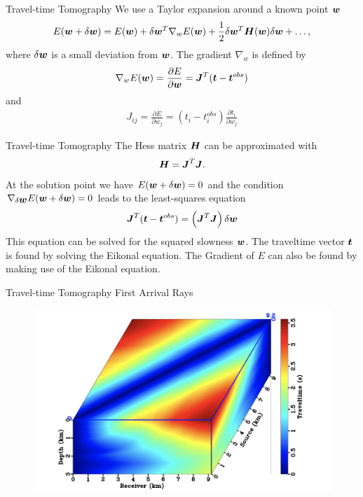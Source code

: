 \documentclass[xcolor=dvipsnames,notes]{beamer}
\begin{document}
\begin{frame}{Travel-time Tomography}
We use a Taylor expansion around a known point $\mbox{\boldmath $w$}$
\begin{eqnarray}
  E(\mbox{\boldmath $w$}+\delta\mbox{\boldmath $w$}) = E(\mbox{\boldmath $w$})+\delta\mbox{\boldmath $w$}^T\nabla_w E(\mbox{\boldmath $w$}) +
                     \frac{1}{2}\delta\mbox{\boldmath $w$}^T\mbox{\boldmath $H$}(\mbox{\boldmath $w$})\delta\mbox{\boldmath $w$} + \ldots,
\end{eqnarray}
where $\delta\mbox{\boldmath $w$}$ is a small deviation from $\mbox{\boldmath $w$}$.
The gradient $\nabla_w$ is defined by
\begin{eqnarray}
  \nabla_w E(\mbox{\boldmath $w$}) = \frac{\partial E}{\partial \mbox{\boldmath $w$}} = \mbox{\boldmath $J$}^T(\mbox{\boldmath $t$}-\mbox{\boldmath $t$}^{obs})
\end{eqnarray}
and
\begin{eqnarray}
J_{ij} = \frac{\partial E}{\partial w_j} = 
           (t_i-t^{obs}_i)\frac{\partial t_i}{\partial w_j}
\end{eqnarray}
\end{frame}
\begin{frame}{Travel-time Tomography}
The Hess matrix $\mbox{\boldmath $H$}$ can be approximated with
%
\begin{eqnarray}
\mbox{\boldmath $H$} = \mbox{\boldmath $J$}^T\mbox{\boldmath $J$}.
\end{eqnarray}
%
At the solution point we have $E(\mbox{\boldmath $w$}+\delta\mbox{\boldmath $w$})=0$ and the condition
$\nabla_{\delta\mbox{\boldmath $w$}}E(\mbox{\boldmath $w$}+\delta\mbox{\boldmath $w$}) = 0$ leads to the least-squares equation
\begin{eqnarray}
  \mbox{\boldmath $J$}^T(\mbox{\boldmath $t$}-\mbox{\boldmath $t$}^{obs}) = \left(\mbox{\boldmath $J$}^T\mbox{\boldmath $J$}\right)\delta\mbox{\boldmath $w$}
\end{eqnarray}
This equation can be solved for the squared slowness $\mbox{\boldmath $w$}$.
The traveltime vector $\mbox{\boldmath $t$}$ is found by solving the Eikonal equation.
The Gradient of $E$ can also be found by making use of the Eikonal equation.
\end{frame}
\begin{frame}{Travel-time Tomography}
First Arrival Rays
\begin{figure}
  \includegraphics[width=\textwidth]{Fig/figa.png}
\end{figure}
\end{frame}
\end{document}
